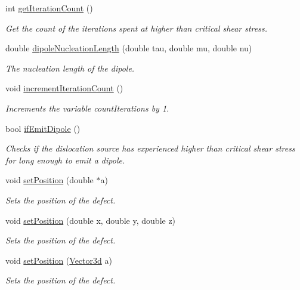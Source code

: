 \begin{DoxyCompactItemize}
int \hyperlink{classDislocationSource_aed222f6992a63a66952d9d9e8d2fe6ac}{get\-Iteration\-Count} ()
\begin{DoxyCompactList}\small\item\em Get the count of the iterations spent at higher than critical shear stress. \end{DoxyCompactList}\item 
double \hyperlink{classDislocationSource_ab1a6ecda50cd9bcd70882b75ec6552ac}{dipole\-Nucleation\-Length} (double tau, double mu, double nu)
\begin{DoxyCompactList}\small\item\em The nucleation length of the dipole. \end{DoxyCompactList}\item 
void \hyperlink{classDislocationSource_a7934f1747dbde5dfe0ca7c2a6bac39ce}{increment\-Iteration\-Count} ()
\begin{DoxyCompactList}\small\item\em Increments the variable count\-Iterations by 1. \end{DoxyCompactList}\item 
bool \hyperlink{classDislocationSource_a8aed9e2ef7057df85b5dc2a24c16c8eb}{if\-Emit\-Dipole} ()
\begin{DoxyCompactList}\small\item\em Checks if the dislocation source has experienced higher than critical shear stress for long enough to emit a dipole. \end{DoxyCompactList}\item 
void \hyperlink{classDefect_a2d233d13a8a93f6fba463a1fbc1c6c9f}{set\-Position} (double $\ast$a)
\begin{DoxyCompactList}\small\item\em Sets the position of the defect. \end{DoxyCompactList}\item 
void \hyperlink{classDefect_ad1a6acd8399d2ecabb7ce2b77623bbec}{set\-Position} (double x, double y, double z)
\begin{DoxyCompactList}\small\item\em Sets the position of the defect. \end{DoxyCompactList}\item 
void \hyperlink{classDefect_a36ffa9b4b01d38ed8a95ca2c78973cc4}{set\-Position} (\hyperlink{classVector3d}{Vector3d} a)
\begin{DoxyCompactList}\small\item\em Sets the position of the defect. \end{DoxyCompactList}\item 

\end{DoxyCompactItemize}
